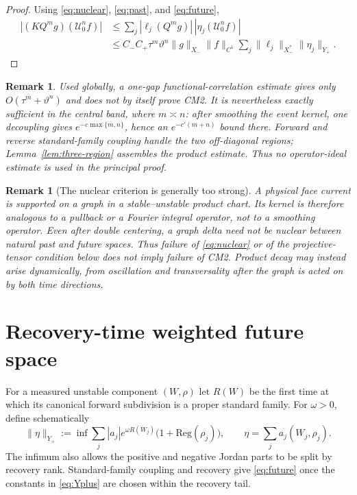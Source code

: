 \documentclass[11pt]{article}
\newtheorem{remark}[theorem]{Remark}
\newcommand{\cU}{\mathcal U}
\begin{document}
\begin{proof}
Using \eqref{eq:nuclear}, \eqref{eq:past}, and \eqref{eq:future},
\begin{align*}
 |(KQ^mg)(\cU_0^nf)|
 &\le\sum_j|\ell_j(Q^mg)|\,
              |\eta_j(\cU_0^nf)|\\
 &\le C_-C_+\tau^m\vartheta^n\|g\|_{X_-}\|f\|_{C^1}
       \sum_j\|\ell_j\|_{X_-^*}\|\eta_j\|_{Y_+}.
\end{align*}
\end{proof}

\begin{remark}
Used globally, a one-gap functional-correlation estimate gives only
$O(\tau^m+\vartheta^n)$ and does not by itself prove CM2.  It is nevertheless
exactly sufficient in the central band, where $m\asymp n$: after smoothing
the event kernel, one decoupling gives $e^{-c\max\{m,n\}}$, hence an
$e^{-c'(m+n)}$ bound there.  Forward and reverse standard-family coupling
handle the two off-diagonal regions; Lemma~\ref{lem:three-region} assembles
the product estimate.  Thus no operator-ideal estimate is used in the
principal proof.
\end{remark}

\begin{remark}[The nuclear criterion is generally too strong]
\label{rem:nuclear-too-strong}
A physical face current is supported on a graph in a stable--unstable product
chart.  Its kernel is therefore analogous to a pullback or a Fourier integral
operator, not to a smoothing operator.  Even after double centering, a graph
delta need not be nuclear between natural past and future spaces.  Thus failure
of \eqref{eq:nuclear} or of the projective-tensor condition below does
\emph{not} imply failure of CM2.  Product decay may instead arise dynamically,
from oscillation and transversality after the graph is acted on by both time
directions.
\end{remark}

\section{Recovery-time weighted future space}

For a measured unstable component $(W,\rho)$ let $R(W)$ be the first time at
which its canonical forward subdivision is a proper standard family.  For
$\omega>0$, define schematically
\begin{equation}
\label{eq:Yplus}
 \|\eta\|_{Y_+}
 :=\inf\sum_j|a_j|e^{\omega R(W_j)}
       \bigl(1+\mathrm{Reg}(\rho_j)\bigr),
 \qquad
 \eta=\sum_ja_j(W_j,\rho_j).
\end{equation}
The infimum also allows the positive and negative Jordan parts to be split by
recovery rank.  Standard-family coupling and recovery give
\eqref{eq:future} once the constants in \eqref{eq:Yplus} are chosen within
the recovery tail.
\end{document}
